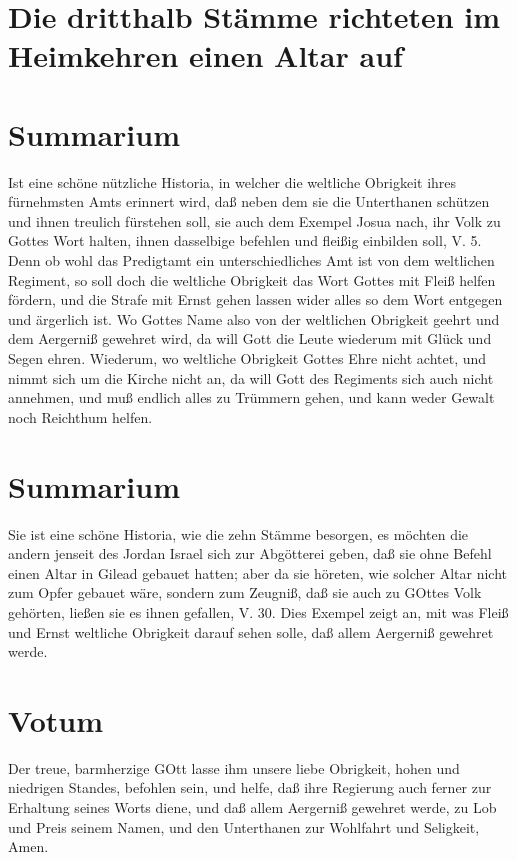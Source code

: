 \section[Die dritthalb Stämme richteten im Heimkehren einen Altar]{Die dritthalb Stämme richteten im Heimkehren einen Altar auf}

\section{Summarium}

Ist eine schöne nützliche Historia, in welcher die weltliche Obrigkeit ihres fürnehmsten Amts erinnert wird, daß neben dem sie die Unterthanen schützen und ihnen treulich fürstehen soll, sie auch dem Exempel Josua nach, ihr Volk zu Gottes Wort halten, ihnen dasselbige befehlen und fleißig einbilden soll, V. 5. Denn ob wohl das Predigtamt ein unterschiedliches Amt ist von dem weltlichen Regiment, so soll doch die weltliche Obrigkeit das Wort Gottes mit Fleiß helfen fördern, und die Strafe mit Ernst gehen lassen wider alles so dem Wort entgegen und ärgerlich ist. Wo Gottes Name also von der weltlichen Obrigkeit geehrt und dem Aergerniß gewehret wird, da will Gott die Leute wiederum mit Glück und Segen ehren. Wiederum, wo weltliche Obrigkeit Gottes Ehre nicht achtet, und nimmt sich um die Kirche nicht an, da will Gott des Regiments sich auch nicht annehmen, und muß endlich alles zu Trümmern gehen, und kann weder Gewalt noch Reichthum helfen.
\section{Summarium}

Sie ist eine schöne Historia, wie die zehn Stämme besorgen, es möchten die andern jenseit des Jordan Israel sich zur Abgötterei geben, daß sie ohne Befehl einen Altar in Gilead gebauet hatten; aber da sie höreten, wie solcher Altar nicht zum Opfer gebauet wäre, sondern zum Zeugniß, daß sie auch zu GOttes Volk gehörten, ließen sie es ihnen gefallen, V. 30. Dies Exempel zeigt an, mit was Fleiß und Ernst weltliche Obrigkeit darauf sehen solle, daß allem Aergerniß gewehret werde.

\section{Votum}

Der treue, barmherzige GOtt lasse ihm unsere liebe Obrigkeit, hohen und niedrigen Standes, befohlen sein, und helfe, daß ihre Regierung auch ferner zur Erhaltung seines Worts diene, und daß allem Aergerniß gewehret werde, zu Lob und Preis seinem Namen, und den Unterthanen zur Wohlfahrt und Seligkeit, Amen.

